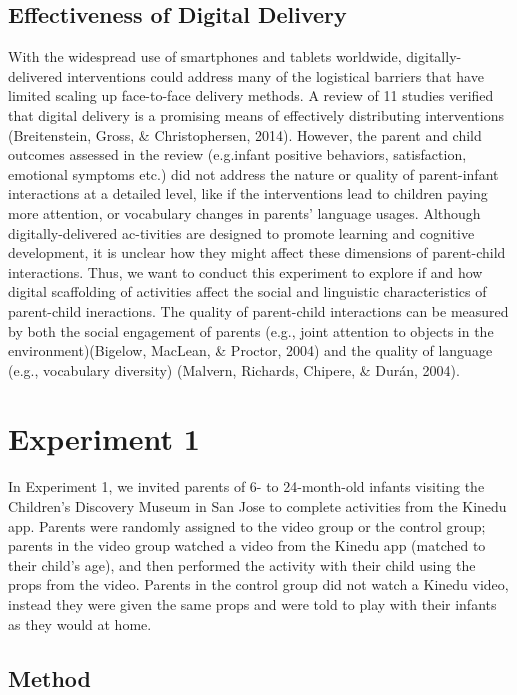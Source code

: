 \documentclass[10pt, letterpaper]{article}
\begin{document}
\subsection{Effectiveness of Digital
Delivery}\label{effectiveness-of-digital-delivery}

With the widespread use of smartphones and tablets worldwide,
digitally-delivered interventions could address many of the logistical
barriers that have limited scaling up face-to-face delivery methods. A
review of 11 studies verified that digital delivery is a promising means
of effectively distributing interventions (Breitenstein, Gross, \&
Christophersen, 2014). However, the parent and child outcomes assessed
in the review (e.g.infant positive behaviors, satisfaction, emotional
symptoms etc.) did not address the nature or quality of parent-infant
interactions at a detailed level, like if the interventions lead to
children paying more attention, or vocabulary changes in parents'
language usages. Although digitally-delivered ac-tivities are designed
to promote learning and cognitive development, it is unclear how they
might affect these dimensions of parent-child interactions. Thus, we
want to conduct this experiment to explore if and how digital
scaffolding of activities affect the social and linguistic
characteristics of parent-child ineractions. The quality of parent-child
interactions can be measured by both the social engagement of parents
(e.g., joint attention to objects in the environment)(Bigelow, MacLean,
\& Proctor, 2004) and the quality of language (e.g., vocabulary
diversity) (Malvern, Richards, Chipere, \& Durán, 2004).

\section{Experiment 1}\label{experiment-1}

In Experiment 1, we invited parents of 6- to 24-month-old infants
visiting the Children's Discovery Museum in San Jose to complete
activities from the Kinedu app. Parents were randomly assigned to the
video group or the control group; parents in the video group watched a
video from the Kinedu app (matched to their child's age), and then
performed the activity with their child using the props from the video.
Parents in the control group did not watch a Kinedu video, instead they
were given the same props and were told to play with their infants as
they would at home.

\subsection{Method}\label{method}
\end{document}
